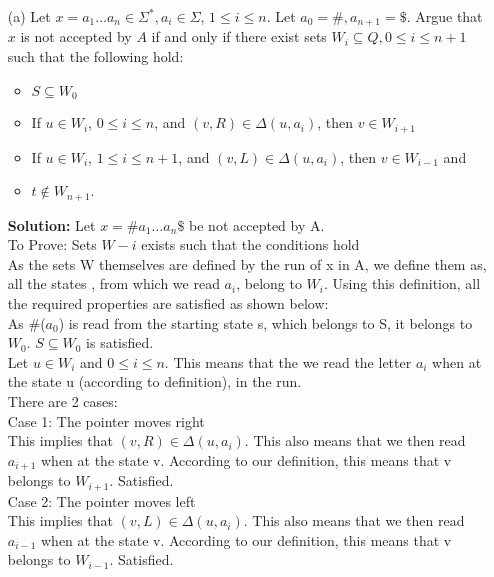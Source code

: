 \documentclass[11pt]{article}
\begin{document}
\begin{enumerate}
		\item[(a)] Let $x = a_1 \dots a_n \in \Sigma^*, a_i \in \Sigma$, $1 \leq i \leq n$. Let $a_0 = \#, a_{n+1} = \$$. Argue that $x$ is not accepted by $A$ if and only if there exist sets $W_i \subseteq Q, 0 \leq i \leq n+1$ such that the following hold:
		\begin{itemize}
			\item $S \subseteq W_0$
			\item If $u \in W_i$, $0 \leq i \leq n$, and $(v, R) \in \Delta(u, a_i)$, then $v \in W_{i+1}$
			\item If $u \in W_i$, $1 \leq i \leq n+1$, and $(v, L) \in \Delta(u, a_i)$, then $v \in W_{i-1}$ and
			\item $t \notin W_{n+1}$.
		\end{itemize}
		
		\textbf{Solution:}
		Let $x = \#a_1 \dots a_n\$$ be not accepted by A. \\
		To Prove: Sets $W-i$ exists such that the conditions hold\\
		As the sets W themselves are defined by the run of x in A, we define them as, all the states , from which we read $a_i$, belong to $W_i$. Using this definition, all the required properties are satisfied as shown below:\\
		
		As \#($a_0$) is read from the starting state s, which belongs to S, it belongs to $W_0$. $S \subseteq W_0$ is satisfied.\\
		
		Let $u \in W_i$ and $0 \leq i \leq n$. This means that the we read the letter $a_i$ when at the state u (according to definition), in the run.\\
		
		There are 2 cases:\\
		
		Case 1: The pointer moves right\\
		This implies that $(v, R) \in \Delta(u, a_i)$. This also means that we then read $a_{i+1}$ when at the state v. According to our definition, this means that v belongs to $W_{i+1}$. Satisfied.\\
		
		Case 2: The pointer moves left\\
		This implies that $(v, L) \in \Delta(u, a_i)$. This also means that we then read $a_{i-1}$ when at the state v. According to our definition, this means that v belongs to $W_{i-1}$. Satisfied.\\
		

\end{enumerate}
\end{document}
